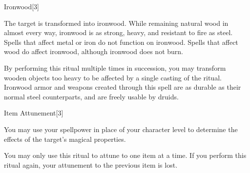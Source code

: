 \begin{spellsection}{Ironwood}[3]
    \begin{spellheader}
    \end{spellheader}
    \begin{spellcontent}
        \begin{spelltargetinginfo}
        \end{spelltargetinginfo}
        \begin{spelleffects}

            \spelleffect The target is transformed into ironwood. While remaining natural wood in almost every way, ironwood is as strong, heavy, and resistant to fire as steel. Spells that affect metal or iron do not function on ironwood. Spells that affect wood do affect ironwood, although ironwood does not burn.
        \end{spelleffects}
    \end{spellcontent}
    \begin{spellfooter}
        \spellnotes By performing this ritual multiple times in succession, you may transform wooden objects too heavy to be affected by a single casting of the ritual. Ironwood armor and weapons created through this spell are as durable as their normal steel counterparts, and are freely usable by druids.
    \end{spellfooter}
\end{spellsection}

\begin{spellsection}{Item Attunement}[3]
    \begin{spellheader}
    \end{spellheader}
    \begin{spellcontent}
        \begin{spelltargetinginfo}
        \end{spelltargetinginfo}
        \begin{spelleffects}

            \spelleffect You may use your spellpower in place of your character level to determine the effects of the target's magical properties.
        \end{spelleffects}
    \end{spellcontent}
    \begin{spellfooter}
        \spellnotes You may only use this ritual to attune to one item at a time. If you perform this ritual again, your attunement to the previous item is lost.
    \end{spellfooter}
\end{spellsection}

